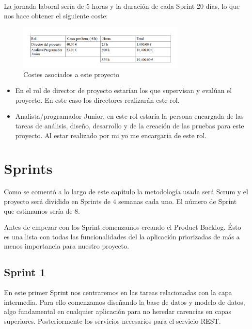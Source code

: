  La jornada laboral sería de 5 horas y la duración de cada Sprint 20 días, lo que nos hace obtener el siguiente coste:


\begin{figure}[H]
		\centering
		\includegraphics[width=0.75\textwidth] {coste.png}
		\caption{Costes asociados a este proyecto }
	\end{figure}






\begin{itemize}
\item En el rol de director de proyecto estarían los que 
supervisan y evalúan el proyecto. En este caso los directores realizarán este rol.

\item Analista/programador Junior, en este rol estaría la persona encargada de las tareas de análisis, diseño, desarrollo y de la creación de las pruebas para este proyecto. Al estar realizado por mi yo me encargaría de este rol.





\end{itemize}
\section{Sprints}

Como se comentó a lo largo de este capítulo la metodología usada será  Scrum y el proyecto será dividido en Sprints de 4 semanas cada uno. El número de Sprint que estimamos sería de 8.




 Antes de empezar con los Sprint comenzamos creando el Product Backlog. Ésto es una lista con todas las funcionalidades del la aplicación priorizadas de más a menos importancia para nuestro proyecto. 

\subsection{Sprint 1}

En este primer Sprint nos centraremos en las tareas relacionadas con la capa intermedia. Para ello comenzamos diseñando la base de datos y modelo de datos, algo fundamental en cualquier aplicación para no heredar carencias en capas superiores. Posteriormente los servicios necesarios para el servicio REST.


